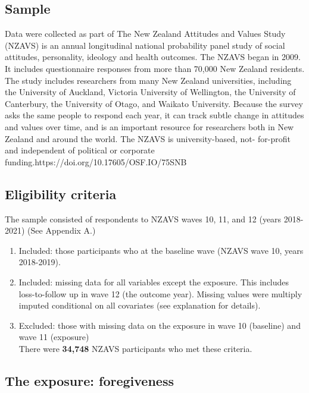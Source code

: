 \documentclass[
  singlecolumn]{report}
\providecommand{\tightlist}{%
  \setlength{\itemsep}{0pt}\setlength{\parskip}{0pt}}\usepackage{longtable,booktabs,array}
\begin{document}
\hypertarget{sample}{%
\subsection{Sample}\label{sample}}

Data were collected as part of The New Zealand Attitudes and Values
Study (NZAVS) is an annual longitudinal national probability panel study
of social attitudes, personality, ideology and health outcomes. The
NZAVS began in 2009. It includes questionnaire responses from more than
70,000 New Zealand residents. The study includes researchers from many
New Zealand universities, including the University of Auckland, Victoria
University of Wellington, the University of Canterbury, the University
of Otago, and Waikato University. Because the survey asks the same
people to respond each year, it can track subtle change in attitudes and
values over time, and is an important resource for researchers both in
New Zealand and around the world. The NZAVS is university-based, not-
for-profit and independent of political or corporate
funding.https://doi.org/10.17605/OSF.IO/75SNB

\hypertarget{eligibility-criteria}{%
\subsection{Eligibility criteria}\label{eligibility-criteria}}

The sample consisted of respondents to NZAVS waves 10, 11, and 12 (years
2018-2021) (See Appendix A.)

\begin{enumerate}
\def\labelenumi{\arabic{enumi}.}
\tightlist
\item
  Included: those participants who at the baseline wave (NZAVS wave 10,
  years 2018-2019).
\item
  Included: missing data for all variables except the exposure. This
  includes loss-to-follow up in wave 12 (the outcome year). Missing
  values were multiply imputed conditional on all covariates (see
  explanation for details).
\item
  Excluded: those with missing data on the exposure in wave 10
  (baseline) and wave 11 (exposure)\\
  There were \textbf{34,748} NZAVS participants who met these criteria.
\end{enumerate}

\hypertarget{the-exposure-foregiveness}{%
\subsection{The exposure:
foregiveness}\label{the-exposure-foregiveness}}
\end{document}
